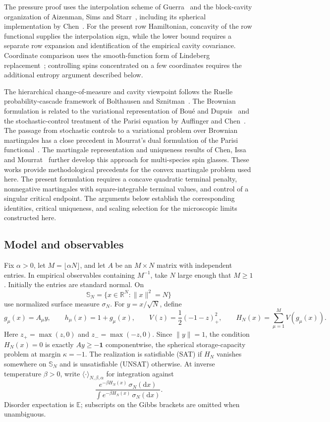 \documentclass[11pt,a4paper]{article}
\numberwithin{equation}{section}
\theoremstyle{definition}
\theoremstyle{remark}
\newcommand{\E}{\mathbb E}
\newcommand{\R}{\mathbb R}
\newcommand{\dd}{\mathrm d}
\begin{document}
The pressure proof uses the interpolation scheme of
Guerra~\cite{Guerra2003} and the block-cavity organization of
Aizenman, Sims and Starr~\cite{AizenmanSimsStarr2003}, including its
spherical implementation by Chen~\cite{Chen2013SphericalASS}.
For the present row Hamiltonian, concavity of the row functional supplies
the interpolation sign, while the lower bound requires a separate row
expansion and identification of the empirical cavity covariance.
Coordinate comparison uses the smooth-function form of Lindeberg
replacement~\cite{Chatterjee2006Lindeberg}; controlling spins concentrated
on a few coordinates requires the additional entropy argument described
below.

The hierarchical change-of-measure and cavity viewpoint follows the
Ruelle probability-cascade framework of Bolthausen and
Sznitman~\cite{BolthausenSznitman1998}.  The Brownian formulation is
related to the variational representation of Bou\'e and
Dupuis~\cite{BoueDupuis1998} and the stochastic-control treatment of the
Parisi equation by Auffinger and Chen~\cite{AuffingerChen2015}.
The passage from stochastic controls to a variational problem over Brownian
martingales has a close precedent in Mourrat's dual formulation of the
Parisi functional~\cite{MourratUninverting2025}.  The martingale
representation and uniqueness results of Chen, Issa and
Mourrat~\cite{ChenIssaMourrat2025} further develop this approach for
multi-species spin glasses.  These works provide methodological precedents
for the convex martingale problem used here.  The present formulation
requires a concave quadratic terminal penalty, nonnegative martingales
with square-integrable terminal values, and control of a singular critical
endpoint.  The arguments below establish the corresponding identities,
critical uniqueness, and scaling selection for the microscopic limits
constructed here.

\subsection{Model and observables}
Fix $\alpha>0$, let $M=\lfloor\alpha N\rfloor$, and let $A$ be an $M\times N$ matrix with independent entries. In empirical observables containing $M^{-1}$, take $N$ large enough that $M\ge1$. Initially the entries are standard normal. On
\[
 \mathbb S_N=\{x\in\R^N:\|x\|^2=N\}
\]
use normalized surface measure $\sigma_N$. For $y=x/\sqrt N$, define
\begin{equation}\label{eq:intro-model}
 g_\mu(x)=A_\mu y,\qquad h_\mu(x)=1+g_\mu(x),\qquad
 V(z)=\frac12(-1-z)_+^2,\qquad H_N(x)=\sum_{\mu=1}^M V(g_\mu(x)).
\end{equation}
Here $z_+=\max(z,0)$ and $z_-=\max(-z,0)$. Since $\|y\|=1$, the condition $H_N(x)=0$ is exactly $Ay\ge-\mathbf 1$ componentwise, the spherical storage-capacity problem at margin $\kappa=-1$. The realization is satisfiable (SAT) if $H_N$ vanishes somewhere on $\mathbb S_N$ and is unsatisfiable (UNSAT) otherwise. At inverse temperature $\beta>0$, write $\langle\cdot\rangle_{N,\beta,\alpha}$ for integration against
\[
 \frac{e^{-\beta H_N(x)}\,\sigma_N(\dd x)}
 {\int e^{-\beta H_N(x)}\,\sigma_N(\dd x)}.
\]
Disorder expectation is $\E$; subscripts on the Gibbs brackets are omitted when unambiguous.
\end{document}
